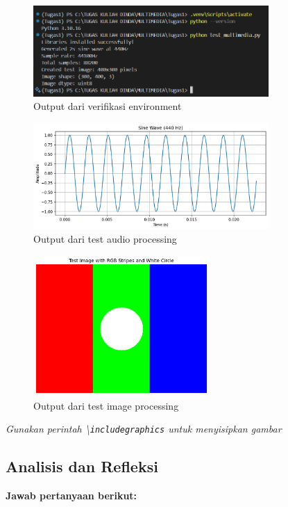 \documentclass[11pt,a4paper]{article}
\begin{document}
\begin{figure}[ht]
    \centering
    \includegraphics[width=0.8\textwidth]{Figure/env_active.png}
    \caption{Output dari verifikasi environment}
    \label{fig:env_verification}
\end{figure}
\begin{figure}[ht]
    \centering 
    \includegraphics[width=0.8\textwidth]{Figure/sine_wave_test.png}
    \caption{Output dari test audio processing}
    \label{fig:sine_wave}
\end{figure}
\begin{figure}[ht]
    \centering
    \includegraphics[width=0.6\textwidth]{Figure/test_image.png}
    \caption{Output dari test image processing}
    \label{fig:test_image}
\end{figure}

\textit{Gunakan perintah \textbackslash\texttt{includegraphics} untuk menyisipkan gambar}

\subsection{Analisis dan Refleksi}
\textbf{Jawab pertanyaan berikut:}
\end{document}

